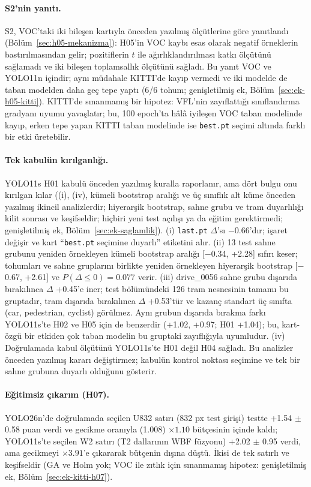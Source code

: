 \documentclass[pdflatex,iicol,sn-mathphys-num]{sn-jnl}
\begin{document}
\paragraph{S2'nin yanıtı.}
S2, VOC'taki iki bileşen kartıyla önceden yazılmış ölçütlerine göre yanıtlandı (Bölüm~\ref{sec:h05-mekanizma}): H05'in VOC kaybı esas olarak negatif örneklerin bastırılmasından gelir; pozitiflerin $t$ ile ağırlıklandırılması katkı ölçütünü sağlamadı ve iki bileşen toplamsallık ölçütünü sağladı. Bu yanıt VOC ve YOLO11n içindir; aynı müdahale KITTI'de kayıp vermedi ve iki modelde de taban modelden daha geç tepe yaptı (6/6 tohum; genişletilmiş ek, Bölüm~\ref{sec:ek-h05-kitti}). KITTI'de sınanmamış bir hipotez: VFL'nin zayıflattığı sınıflandırma gradyanı uyumu yavaşlatır; bu, 100 epoch'ta hâlâ iyileşen VOC taban modelinde kayıp, erken tepe yapan KITTI taban modelinde ise \texttt{best.pt} seçimi altında farklı bir etki üretebilir.

\paragraph{Tek kabulün kırılganlığı.}
YOLO11s H01 kabulü önceden yazılmış kuralla raporlanır, ama dört bulgu onu kırılgan kılar ((i), (iv), kümeli bootstrap aralığı ve üç sınıflık alt küme önceden yazılmış ikincil analizlerdir; hiyerarşik bootstrap, sahne grubu ve tram duyarlılığı kilit sonrası ve keşifseldir; hiçbiri yeni test açılışı ya da eğitim gerektirmedi; genişletilmiş ek, Bölüm~\ref{sec:ek-saglamlik}). (i) \texttt{last.pt} $\Delta$'sı $-$0.66'dır; işaret değişir ve kart ``\texttt{best.pt} seçimine duyarlı'' etiketini alır. (ii) 13 test sahne grubunu yeniden örnekleyen kümeli bootstrap aralığı [$-$0.34, +2.28] sıfırı keser; tohumları ve sahne gruplarını birlikte yeniden örnekleyen hiyerarşik bootstrap [$-$0.67, +2.61] ve $P(\Delta\le0)=0.077$ verir. (iii) drive\_0056 sahne grubu dışarıda bırakılınca $\Delta$ +0.45'e iner; test bölümündeki 126 tram nesnesinin tamamı bu gruptadır, tram dışarıda bırakılınca $\Delta$ +0.53'tür ve kazanç standart üç sınıfta (car, pedestrian, cyclist) görülmez. Aynı grubun dışarıda bırakma farkı YOLO11s'te H02 ve H05 için de benzerdir (+1.02, +0.97; H01 +1.04); bu, kart-özgü bir etkiden çok taban modelin bu gruptaki zayıflığıyla uyumludur. (iv) Doğrulamada kabul ölçütünü YOLO11s'te H01 değil H04 sağladı. Bu analizler önceden yazılmış kararı değiştirmez; kabulün kontrol noktası seçimine ve tek bir sahne grubuna duyarlı olduğunu gösterir.

\paragraph{Eğitimsiz çıkarım (H07).}
YOLO26n'de doğrulamada seçilen U832 satırı (832 px test girişi) testte +1.54 $\pm$ 0.58 puan verdi ve gecikme oranıyla (1.008) $\times1.10$ bütçesinin içinde kaldı; YOLO11s'te seçilen W2 satırı (T2 dallarının WBF füzyonu) +2.02 $\pm$ 0.95 verdi, ama gecikmeyi $\times3.91$'e çıkararak bütçenin dışına düştü. İkisi de tek satırlı ve keşifseldir (GA ve Holm yok; VOC ile zıtlık için sınanmamış hipotez: genişletilmiş ek, Bölüm~\ref{sec:ek-kitti-h07}).
\end{document}
